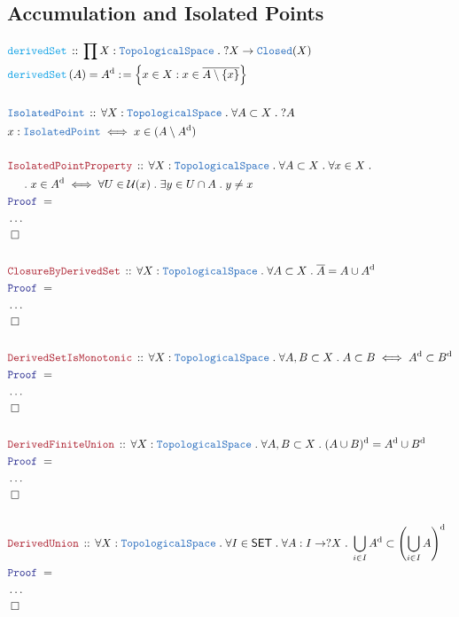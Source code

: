 \documentclass[12pt]{scrartcl}
\newcommand{\TYPE}[1]{\textcolor{NavyBlue}{\mathtt{#1}}}
\newcommand{\FUNC}[1]{\textcolor{Cerulean}{\mathtt{#1}}}
\newcommand{\LOGIC}[1]{\textcolor{Blue}{\mathtt{#1}}}
\newcommand{\THM}[1]{\textcolor{Maroon}{\mathtt{#1}}}
\renewcommand{\.}{\; . \;}
\newcommand{\de}{: \kern 0.1pc =}
\newcommand{\Act}[1]{\left( #1 \right)}
\newcommand{\Theorem}[2]{& \THM{#1} \, :: \, #2 \\ & \Proof = \\ }
\newcommand{\DeclareType}[2]{& \TYPE{#1} \, :: \, #2 \\}
\newcommand{\DefineType}[3]{& #1 : \TYPE{#2} \iff #3 \\}
\newcommand{\DeclareFunc}[2]{& \FUNC{#1} \, :: \, #2 \\}
\newcommand{\DefineNamedFunc}[4]{&  \FUNC{#1}\Act{#2} = #3 \de #4 \\}
\newcommand{\NewLine}{\\ & \kern 1pc}
\newcommand{\Page}[1]{ \begin{align*} #1 \end{align*}   }
\newcommand{\NoProof}{ & \ldots \\ \EndProof}
\newcommand{\QED}{\; \square}
\newcommand{\EndProof}{& \QED \\}
\newcommand{\Proof}{\LOGIC{Proof} \; }
\newcommand{\SET}{\mathsf{SET}}
\newcommand{\TS}{\TYPE{TopologicalSpace}}
\newcommand{\U}{\mathcal{U}}
\renewcommand{\d}{\mathrm{d}}
\begin{document}
\subsection{Accumulation and Isolated Points}
\Page{
	\DeclareFunc{derivedSet}
	{
		\prod X : \TS \. 
		?X \to \TYPE{Closed}(X)
	}
	\DefineNamedFunc{derivedSet}{A}{A^\d}
	{ \Big\{ x \in X : 
		 x \in \overline{A \setminus \{x\}}   \Big\}  }
	\\
	\DeclareType{IsolatedPoint}
	{
		\forall X : \TS \.
		\forall A \subset X \.
		?A
	}
	\DefineType{x}{IsolatedPoint}
	{
		x \in (A \setminus A^\d)
	}
	\\
	\Theorem{IsolatedPointProperty}
	{
		\forall X : \TS \.
		\forall A \subset X \.
		\forall x \in X \.
		\NewLine \. 
		x  \in A^\d 
		\iff
		\forall U \in \U(x) \.
		\exists  y \in U \cap A \.
		y \neq x
	}
	\NoProof
	\\
	\Theorem{ClosureByDerivedSet}
	{
		\forall X : \TS \.
		\forall A \subset X \.
		\overline{A} = A \cup A^{\d}
	}
	\NoProof
	\\
	\Theorem{DerivedSetIsMonotonic}
	{
		\forall X  : \TS \.
		\forall A,B \subset X \. 
		A \subset B \iff A^{\d} \subset B^{\d}
	}
	\NoProof
	\\
	\Theorem{DerivedFiniteUnion}
	{
		\forall X : \TS \.
		\forall A,B \subset X \.
		(A \cup B)^\d = A^\d \cup B^\d
	}
	\NoProof
	\\
	\Theorem{DerivedUnion}
	{
		\forall X : \TS \.
		\forall I \in \SET \.
		\forall A : I \to ?X \.
		\bigcup_{i \in I} A^\d \subset 
		\left( \bigcup_{i \in I} A \right)^\d
	}
	\NoProof
}
\newpage
\end{document}
